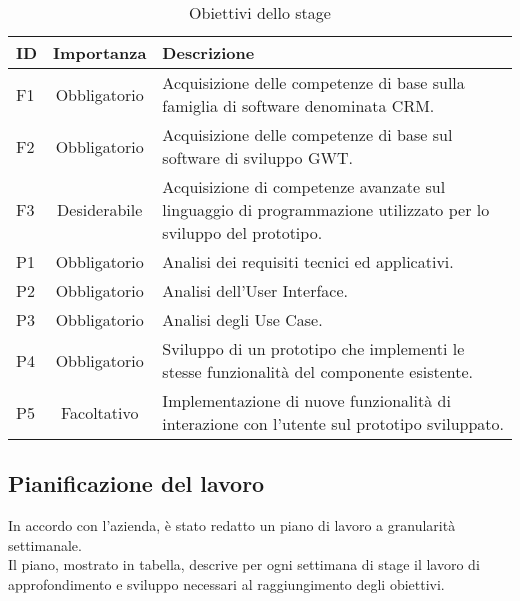 \begin{table}[h]
\centering
\caption{Obiettivi dello stage}
\label{tab:obiettivi}
\begin{tabular}{|l|c|p{7cm}|}
\hline
ID & Importanza & Descrizione \\
\hline
F1 & Obbligatorio & Acquisizione delle competenze di base sulla famiglia di software denominata CRM.\\
\hline
F2 & Obbligatorio & Acquisizione delle competenze di base sul software di sviluppo GWT.\\
\hline
F3 & Desiderabile & Acquisizione di competenze avanzate sul linguaggio di programmazione utilizzato per lo sviluppo del prototipo.\\
\hline
P1 & Obbligatorio & Analisi dei requisiti tecnici ed applicativi.\\
\hline
P2 & Obbligatorio & Analisi dell'User Interface.\\
\hline
P3 & Obbligatorio & Analisi degli Use Case.\\
\hline
P4 & Obbligatorio & Sviluppo di un prototipo che implementi le stesse funzionalità del componente esistente.\\
\hline
P5 & Facoltativo & Implementazione di nuove funzionalità di interazione con l'utente sul prototipo sviluppato.\\
\hline
\end{tabular}
\end{table}


\subsection{Pianificazione del lavoro}
In accordo con l'azienda, è stato redatto un piano di lavoro a granularità settimanale. \\
Il piano, mostrato in tabella, descrive per ogni settimana di stage il lavoro di approfondimento e sviluppo necessari al raggiungimento degli obiettivi. \\%

